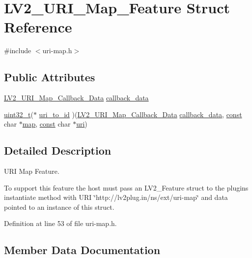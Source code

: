 \hypertarget{struct_l_v2___u_r_i___map___feature}{}\section{L\+V2\+\_\+\+U\+R\+I\+\_\+\+Map\+\_\+\+Feature Struct Reference}
\label{struct_l_v2___u_r_i___map___feature}


{\ttfamily \#include $<$uri-\/map.\+h$>$}

\subsection*{Public Attributes}
\begin{DoxyCompactItemize}
\item 
\hyperlink{uri-map_8h_adbac08f0bf00040db3c0298270df0c62}{L\+V2\+\_\+\+U\+R\+I\+\_\+\+Map\+\_\+\+Callback\+\_\+\+Data} \hyperlink{struct_l_v2___u_r_i___map___feature_a59fe3d004c8514ed1bfc60c7cd2958f0}{callback\+\_\+data}
\item 
\hyperlink{lib-src_2ffmpeg_2win32_2stdint_8h_a6eb1e68cc391dd753bc8ce896dbb8315}{uint32\+\_\+t}($\ast$ \hyperlink{struct_l_v2___u_r_i___map___feature_aa493702a04a2b8dbdb950ff6eb6c940d}{uri\+\_\+to\+\_\+id} )(\hyperlink{uri-map_8h_adbac08f0bf00040db3c0298270df0c62}{L\+V2\+\_\+\+U\+R\+I\+\_\+\+Map\+\_\+\+Callback\+\_\+\+Data} \hyperlink{struct_l_v2___u_r_i___map___feature_a59fe3d004c8514ed1bfc60c7cd2958f0}{callback\+\_\+data}, \hyperlink{getopt1_8c_a2c212835823e3c54a8ab6d95c652660e}{const} char $\ast$\hyperlink{structmap}{map}, \hyperlink{getopt1_8c_a2c212835823e3c54a8ab6d95c652660e}{const} char $\ast$\hyperlink{lib_2expat_8h_a5a9fdd6c2606370ad12f24c078ac6585}{uri})
\end{DoxyCompactItemize}


\subsection{Detailed Description}
U\+RI Map Feature.

To support this feature the host must pass an L\+V2\+\_\+\+Feature struct to the plugin\textquotesingle{}s instantiate method with U\+RI \char`\"{}http\+://lv2plug.\+in/ns/ext/uri-\/map\char`\"{} and data pointed to an instance of this struct. 

Definition at line 53 of file uri-\/map.\+h.



\subsection{Member Data Documentation}

